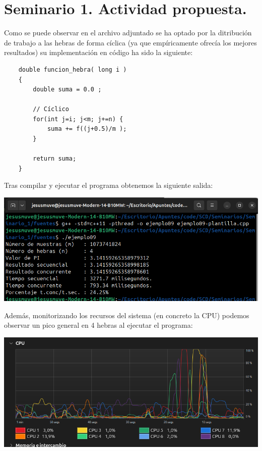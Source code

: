 \documentclass[12pt]{article}
\begin{document}
    \portada[%
        titulo=Sistemas Concurrentes y Distribuidos,
        subtitulo=Seminario 1,
        autor=Jesús Muñoz Velasco,
        año=Curso 2024-2025,
        imagen=../../../../documents/_assets/Logo-UGR-Black.png]
        

    \section{Seminario 1. Actividad propuesta.}
    
    Como se puede observar en el archivo adjuntado se ha optado por la ditribución de trabajo a las hebras de forma cíclica (ya que empíricamente ofrecía los mejores resultados) su implementación en código ha sido la siguiente: 

    \begin{verbatim}
    double funcion_hebra( long i )
    {
        double suma = 0.0 ;

        // Cíclico
        for(int j=i; j<m; j+=n) {
            suma += f((j+0.5)/m );
        }

        return suma;
    }
    \end{verbatim}

    Tras compilar y ejecutar el programa obtenemos la siguiente salida:\\

    \begin{center}
        \includegraphics[width=15cm]{./salida_ejecucion.png}
    \end{center}

    Además, monitorizando los recursos del sistema (en concreto la CPU) podemos observar un pico general en 4 hebras al ejecutar el programa:

    \begin{center}
        \includegraphics[width=15cm]{./recursos.png}
    \end{center}
\end{document}
